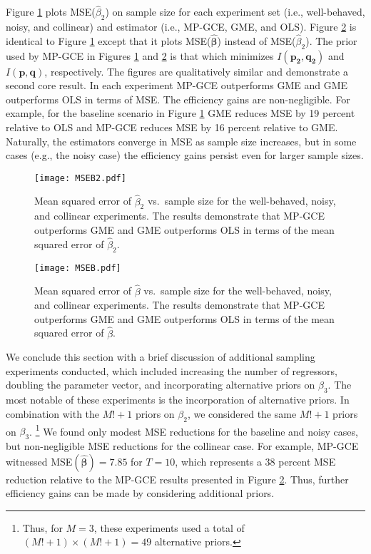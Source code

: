 \documentclass{elsarticle}
\begin{document}
Figure \ref{fig: MSEB1} plots MSE($\hat{\beta}_2$) on sample size for each 
experiment set (i.e., well-behaved, noisy, and collinear) and estimator (i.e., MP-GCE, 
GME, and OLS).
Figure \ref{fig: MSEB} is identical to Figure \ref{fig: MSEB1} except that it plots 
MSE($\mathbf{\hat{\beta}}$) instead of MSE($\hat{\beta}_2$).
The prior used by MP-GCE in Figures \ref{fig: MSEB1} and \ref{fig: MSEB} is that which 
minimizes $I(\mathbf{p_2}, \mathbf{q_2})$ and $I(\mathbf{p}, \mathbf{q})$, respectively.
The figures are qualitatively similar and demonstrate a second core result.
In each experiment MP-GCE outperforms GME and GME outperforms OLS in terms of MSE.
The efficiency gains are non-negligible.
For example, for the baseline scenario in Figure \ref{fig: MSEB1} GME reduces MSE by 
19 percent relative to OLS and MP-GCE reduces MSE by 16 percent relative to GME.
Naturally, the estimators converge in MSE as sample size increases, but in some cases
(e.g., the noisy case) the efficiency gains persist even for larger sample sizes.

\begin{figure}[htbp]
\centering
\texttt{[image: MSEB2.pdf]}
\caption{Mean squared error of $\hat{\beta}_2$ vs.\ sample size for the well-behaved,
noisy, and collinear experiments. The results demonstrate that MP-GCE outperforms 
GME and GME outperforms OLS in terms of the mean squared error of $\hat{\beta}_2$.}
\label{fig: MSEB1}
\end{figure}

\begin{figure}[htbp]
\centering
\texttt{[image: MSEB.pdf]}
\caption{Mean squared error of $\hat{\beta}$ vs.\ sample size for the well-behaved,
noisy, and collinear experiments. The results demonstrate that MP-GCE outperforms 
GME and GME outperforms OLS in terms of the mean squared error of $\hat{\beta}$.}
\label{fig: MSEB}
\end{figure}

We conclude this section with a brief discussion of additional sampling 
experiments conducted, which included increasing the number of regressors,
doubling the parameter vector, and incorporating alternative priors on $\beta_3$.
The most notable of these experiments is the incorporation of alternative priors.
In combination with the $M! + 1$ priors on $\beta_2$, we considered the 
same $M! + 1$ priors on $\beta_3$.%
\footnote{Thus, for $M=3$, these experiments used a total of $(M! + 1)\times (M! + 1) 
= 49$ alternative priors.}
We found only modest MSE reductions for the baseline and noisy cases, but
non-negligible MSE reductions for the collinear case.
For example, MP-GCE witnessed MSE$(\mathbf{\hat{\beta}})=7.85$ for $T=10$,
which represents a 38 percent MSE reduction relative to the MP-GCE results presented
in Figure \ref{fig: MSEB}.
Thus, further efficiency gains can be made by considering additional priors.
\end{document}
